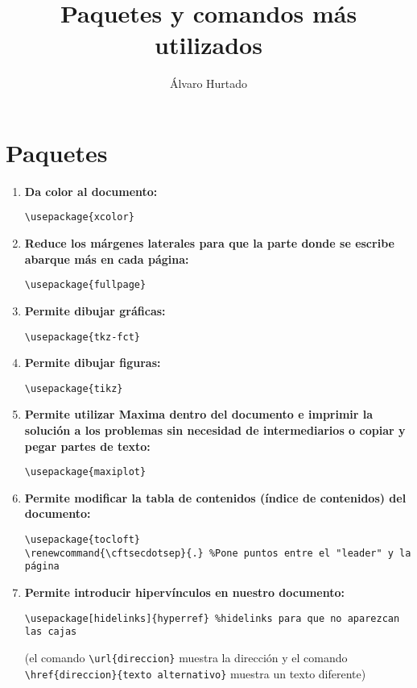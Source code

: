 \documentclass[11pt,a4paper]{article}
\author{Álvaro Hurtado}
\title{Paquetes y comandos más utilizados}
\date{}
\begin{document}
\maketitle
\tableofcontents

\section{Paquetes}

\begin{enumerate}

\item \textbf{Da color al documento:}
\begin{verbatim}
\usepackage{xcolor}
\end{verbatim}

\item \textbf{Reduce los márgenes laterales para que la parte donde se escribe abarque más en cada página:}
\begin{verbatim}
\usepackage{fullpage}
\end{verbatim}

\item \textbf{Permite dibujar gráficas:}
\begin{verbatim}
\usepackage{tkz-fct}
\end{verbatim}

\item \textbf{Permite dibujar figuras:}
\begin{verbatim}
\usepackage{tikz}
\end{verbatim}

\item \textbf{Permite utilizar Maxima dentro del documento e imprimir la solución a los problemas sin necesidad de intermediarios o copiar y pegar partes de texto:}
\begin{verbatim}
\usepackage{maxiplot}
\end{verbatim}

\item \textbf{Permite modificar la tabla de contenidos (índice de contenidos) del documento:}
\begin{verbatim}
\usepackage{tocloft}
\renewcommand{\cftsecdotsep}{.} %Pone puntos entre el "leader" y la página
\end{verbatim}

\item \textbf{Permite introducir hipervínculos en nuestro documento:}
\begin{verbatim}
\usepackage[hidelinks]{hyperref} %hidelinks para que no aparezcan las cajas
\end{verbatim}
(el comando \verb|\url{direccion}| muestra la dirección y el comando\\ \verb|\href{direccion}{texto alternativo}| muestra un texto diferente)


\end{enumerate}
\end{document}
